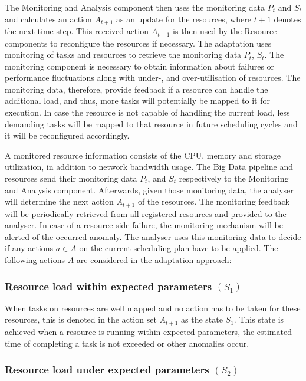     The Monitoring and Analysis component then uses the monitoring data $P_t$ and $S_t$ and calculates an action $A_{t+1}$ as an update for the resources, where $t+1$ denotes the next time step.
    This received action $A_{t+1}$ is then used by the Resource components to reconfigure the resources if necessary.
    The adaptation uses monitoring of tasks and resources to retrieve the monitoring data $P_t$, $S_t$.
    The monitoring component is necessary to obtain information about failures or performance fluctuations along with under-, and over-utilisation of resources.
    The monitoring data, therefore, provide feedback if a resource can handle the additional load, and thus, more tasks will potentially be mapped to it for execution. 
    In case the resource is not capable of handling the current load, less demanding tasks will be mapped to that resource in future scheduling cycles and it will be reconfigured accordingly.

    A monitored resource information consists of the CPU, memory and storage utilization, in addition to network bandwidth usage.
    The Big Data pipeline and resources send their monitoring data $P_t$, and $S_t$ respectively to the Monitoring and Analysis component.
    Afterwards, given those monitoring data, the analyser will determine the next action $A_{t+1}$ of the resources.
    The monitoring feedback will be periodically retrieved from all registered resources and provided to the analyser.
    In case of a resource side failure, the monitoring mechanism will be alerted of the occurred anomaly.  
    The analyser uses this monitoring data to decide if any actions $a \in A$ on the current scheduling plan have to be applied.
    The following actions $A$ are considered in the adaptation approach:

    \subsubsection*{Resource load within expected parameters $(S_1)$} 

      When tasks on resources are well mapped and no action has to be taken for these resources, this is denoted in the action set $A_{t+1}$ as the state $S_1$. This state is achieved when a resource is running within expected parameters, the estimated time of completing a task is not exceeded or other anomalies occur.

    \subsubsection*{Resource load under expected parameters $(S_2)$}

